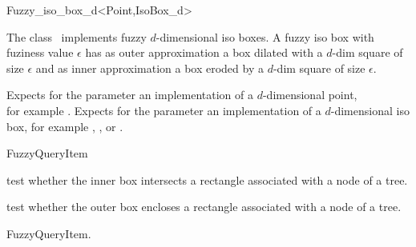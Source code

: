 

\begin{ccRefClass}{Fuzzy_iso_box_d<Point,IsoBox_d>}  %


\ccDefinition
  
The class \ccRefName\ implements fuzzy $d$-dimensional iso boxes.
A fuzzy iso box with fuziness value $\epsilon$ has
as outer approximation a box  dilated with a $d$-dim square of size $\epsilon$ and
as inner approximation a box eroded by a $d$-dim square of size $\epsilon$. 


\ccParameters
Expects for the parameter  an implementation of a $d$-dimensional point,\\
for example .
Expects for the parameter  an implementation of a $d$-dimensional iso box,
for example , , or
.
 
\ccIsModel

FuzzyQueryItem

\ccTypes


\ccCreation
{}  %



\ccOperations


{test whether the inner box intersects a rectangle
associated with a node of a tree.}

{test whether the outer box encloses a rectangle
associated with a node of a tree.}

\ccSeeAlso

FuzzyQueryItem.




\end{ccRefClass}


